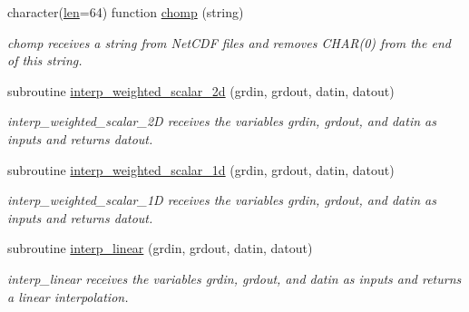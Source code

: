 \begin{DoxyCompactItemize}
character(\hyperlink{namespaceinterpolator__mod_a6bd2ec3395203e1b6aba0610bfbfe16b}{len}=64) function \hyperlink{namespaceinterpolator__mod_aa04edf3968e85b9668bf62703731acdc}{chomp} (string)
\begin{DoxyCompactList}\small\item\em chomp receives a string from Net\+C\+DF files and removes C\+H\+A\+R(0) from the end of this string. \end{DoxyCompactList}\item 
subroutine \hyperlink{namespaceinterpolator__mod_a65bb3b15489368783390f1fe8dcd1348}{interp\+\_\+weighted\+\_\+scalar\+\_\+2d} (grdin, grdout, datin, datout)
\begin{DoxyCompactList}\small\item\em interp\+\_\+weighted\+\_\+scalar\+\_\+2D receives the variables grdin, grdout, and datin as inputs and returns datout. \end{DoxyCompactList}\item 
subroutine \hyperlink{namespaceinterpolator__mod_a3afd6e8f20a531fd96730e8222b3a9ad}{interp\+\_\+weighted\+\_\+scalar\+\_\+1d} (grdin, grdout, datin, datout)
\begin{DoxyCompactList}\small\item\em interp\+\_\+weighted\+\_\+scalar\+\_\+1D receives the variables grdin, grdout, and datin as inputs and returns datout. \end{DoxyCompactList}\item 
subroutine \hyperlink{namespaceinterpolator__mod_ac3ca9de401cf09ffba68bd1c8a58f949}{interp\+\_\+linear} (grdin, grdout, datin, datout)
\begin{DoxyCompactList}\small\item\em interp\+\_\+linear receives the variables grdin, grdout, and datin as inputs and returns a linear interpolation. \end{DoxyCompactList}\end{DoxyCompactItemize}
